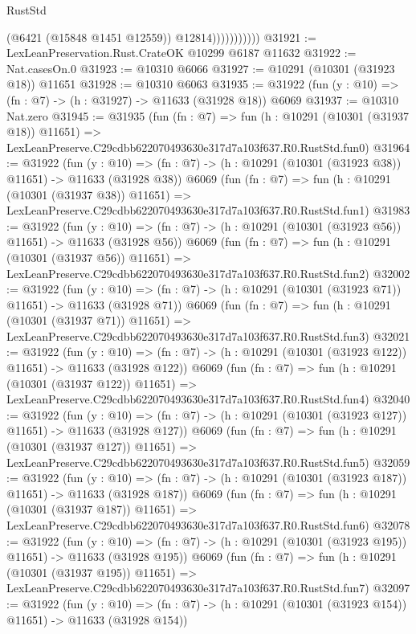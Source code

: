 \begin{lexlean}{RustStd}
\begin{coremodule}
                          (@6421 (@15848 @1451 @12559))
                          @12814)))))))))))
@31921 := LexLeanPreservation.Rust.CrateOK @10299 @6187 @11632
@31922 := Nat.casesOn.{0}
@31923 := @10310 @6066
@31927 := @10291 (@10301 (@31923 @18)) @11651
@31928 := @10310 @6063
@31935 := @31922 (fun (y : @10) => (fn : @7) -> (h : @31927) -> @11633 (@31928 @18)) @6069
@31937 := @10310 Nat.zero
@31945 := @31935
    (fun (fn : @7) =>
    fun (h : @10291 (@10301 (@31937 @18)) @11651) =>
    LexLeanPreserve.C29cdbb622070493630e317d7a103f637.R0.RustStd.fun0)
@31964 := @31922
    (fun (y : @10) => (fn : @7) -> (h : @10291 (@10301 (@31923 @38)) @11651) -> @11633 (@31928 @38))
    @6069
    (fun (fn : @7) =>
    fun (h : @10291 (@10301 (@31937 @38)) @11651) =>
    LexLeanPreserve.C29cdbb622070493630e317d7a103f637.R0.RustStd.fun1)
@31983 := @31922
    (fun (y : @10) => (fn : @7) -> (h : @10291 (@10301 (@31923 @56)) @11651) -> @11633 (@31928 @56))
    @6069
    (fun (fn : @7) =>
    fun (h : @10291 (@10301 (@31937 @56)) @11651) =>
    LexLeanPreserve.C29cdbb622070493630e317d7a103f637.R0.RustStd.fun2)
@32002 := @31922
    (fun (y : @10) => (fn : @7) -> (h : @10291 (@10301 (@31923 @71)) @11651) -> @11633 (@31928 @71))
    @6069
    (fun (fn : @7) =>
    fun (h : @10291 (@10301 (@31937 @71)) @11651) =>
    LexLeanPreserve.C29cdbb622070493630e317d7a103f637.R0.RustStd.fun3)
@32021 := @31922
    (fun (y : @10) =>
    (fn : @7) -> (h : @10291 (@10301 (@31923 @122)) @11651) -> @11633 (@31928 @122))
    @6069
    (fun (fn : @7) =>
    fun (h : @10291 (@10301 (@31937 @122)) @11651) =>
    LexLeanPreserve.C29cdbb622070493630e317d7a103f637.R0.RustStd.fun4)
@32040 := @31922
    (fun (y : @10) =>
    (fn : @7) -> (h : @10291 (@10301 (@31923 @127)) @11651) -> @11633 (@31928 @127))
    @6069
    (fun (fn : @7) =>
    fun (h : @10291 (@10301 (@31937 @127)) @11651) =>
    LexLeanPreserve.C29cdbb622070493630e317d7a103f637.R0.RustStd.fun5)
@32059 := @31922
    (fun (y : @10) =>
    (fn : @7) -> (h : @10291 (@10301 (@31923 @187)) @11651) -> @11633 (@31928 @187))
    @6069
    (fun (fn : @7) =>
    fun (h : @10291 (@10301 (@31937 @187)) @11651) =>
    LexLeanPreserve.C29cdbb622070493630e317d7a103f637.R0.RustStd.fun6)
@32078 := @31922
    (fun (y : @10) =>
    (fn : @7) -> (h : @10291 (@10301 (@31923 @195)) @11651) -> @11633 (@31928 @195))
    @6069
    (fun (fn : @7) =>
    fun (h : @10291 (@10301 (@31937 @195)) @11651) =>
    LexLeanPreserve.C29cdbb622070493630e317d7a103f637.R0.RustStd.fun7)
@32097 := @31922
    (fun (y : @10) =>
    (fn : @7) -> (h : @10291 (@10301 (@31923 @154)) @11651) -> @11633 (@31928 @154))

\end{coremodule}
\end{lexlean}
